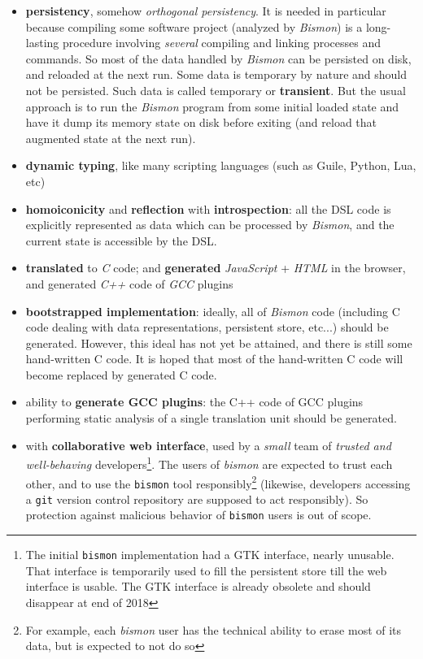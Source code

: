 \begin{itemize}

  \item \textbf{persistency}, somehow \textit{orthogonal
    persistency}. It is needed in particular because compiling some
    software project (analyzed by \textit{Bismon}) is a long-lasting
    procedure involving \textit{several} compiling and linking
    processes and commands. So most of the data handled by
    \textit{Bismon} can be persisted on disk, and reloaded at the next
    run. Some data is temporary by nature and should not be
    persisted. Such data is called temporary or
    \textbf{transient}. But the usual approach is to run the
    \textit{Bismon} program from some initial loaded state and have it
    dump its memory state on disk before exiting (and reload that
    augmented state at the next run).

  \item \textbf{dynamic typing}, like many scripting languages (such
    as Guile, Python, Lua, etc)

  \item \textbf{homoiconicity} and \textbf{reflection} with
    \textbf{introspection}: all the DSL code is explicitly represented
    as data which can be processed by \textit{Bismon}, and the current
    state is accessible by the DSL.

    \item \textbf{translated} to \emph{C} code; and \textbf{generated}
      \emph{JavaScript} + \emph{HTML} in the browser, and generated
      \emph{C++} code of \emph{GCC} plugins

    \item \textbf{bootstrapped implementation}: ideally, all of
      \textit{Bismon} code (including C code dealing with data
      representations, persistent store, etc...) should be
      generated. However, this ideal has not yet be attained, and
      there is still some hand-written C code. It is hoped that most
      of the hand-written C code will become replaced by generated C
      code.
    \item ability to \textbf{generate GCC plugins}: the C++ code of
      GCC plugins performing static analysis of a single translation
      unit should be generated.

    \item with \textbf{collaborative web interface}, used by a
      \emph{small} team of \emph{trusted and well-behaving}
      developers\footnote{The initial \texttt{bismon} implementation
        had a GTK interface, nearly unusable. That interface is
        temporarily used to fill the persistent store till the web
        interface is usable. The GTK interface is already obsolete and
        should disappear at end of 2018}. The users of \emph{bismon}
      are expected to trust each other, and to use the \texttt{bismon}
      tool responsibly\footnote{For example, each \emph{bismon} user
        has the technical ability to erase most of its data, but is
        expected to not do so} (likewise, developers accessing a
      \texttt{git} version control repository are supposed to act
      responsibly). So protection against malicious behavior of
      \texttt{bismon} users is out of scope.


\end{itemize}
